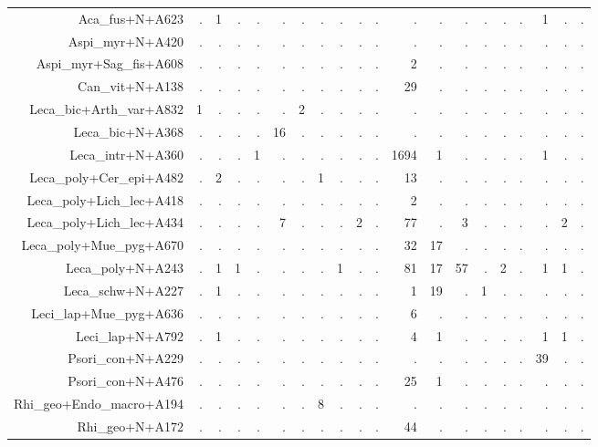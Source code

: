 \documentclass[a4paper, 11]{article}\usepackage[]{graphicx}\usepackage[]{color}
\begin{document}
\begin{table}
\begin{tabular}{rrrrrrrrrrrrrrrrrrrr}
  \hline
Aca\_fus+N+A623 & . & 1 & . & . & . & . & . & . & . & . & . & . & . & . & . & . & 1 & . & . \\ 
  Aspi\_myr+N+A420 & . & . & . & . & . & . & . & . & . & . & . & . & . & . & . & . & . & . & . \\ 
  Aspi\_myr+Sag\_fis+A608 & . & . & . & . & . & . & . & . & . & . & 2 & . & . & . & . & . & . & . & . \\ 
  Can\_vit+N+A138 & . & . & . & . & . & . & . & . & . & . & 29 & . & . & . & . & . & . & . & . \\ 
  Leca\_bic+Arth\_var+A832 & 1 & . & . & . & . & 2 & . & . & . & . & . & . & . & . & . & . & . & . & . \\ 
  Leca\_bic+N+A368 & . & . & . & . & 16 & . & . & . & . & . & . & . & . & . & . & . & . & . & . \\ 
  Leca\_intr+N+A360 & . & . & . & 1 & . & . & . & . & . & . & 1694 & 1 & . & . & . & . & 1 & . & . \\ 
  Leca\_poly+Cer\_epi+A482 & . & 2 & . & . & . & . & 1 & . & . & . & 13 & . & . & . & . & . & . & . & . \\ 
  Leca\_poly+Lich\_lec+A418 & . & . & . & . & . & . & . & . & . & . & 2 & . & . & . & . & . & . & . & . \\ 
  Leca\_poly+Lich\_lec+A434 & . & . & . & . & 7 & . & . & . & 2 & . & 77 & . & 3 & . & . & . & . & 2 & . \\ 
  Leca\_poly+Mue\_pyg+A670 & . & . & . & . & . & . & . & . & . & . & 32 & 17 & . & . & . & . & . & . & . \\ 
  Leca\_poly+N+A243 & . & 1 & 1 & . & . & . & . & 1 & . & . & 81 & 17 & 57 & . & 2 & . & 1 & 1 & . \\ 
  Leca\_schw+N+A227 & . & 1 & . & . & . & . & . & . & . & . & 1 & 19 & . & 1 & . & . & . & . & . \\ 
  Leci\_lap+Mue\_pyg+A636 & . & . & . & . & . & . & . & . & . & . & 6 & . & . & . & . & . & . & . & . \\ 
  Leci\_lap+N+A792 & . & 1 & . & . & . & . & . & . & . & . & 4 & 1 & . & . & . & . & 1 & 1 & . \\ 
  Psori\_con+N+A229 & . & . & . & . & . & . & . & . & . & . & . & . & . & . & . & . & 39 & . & . \\ 
  Psori\_con+N+A476 & . & . & . & . & . & . & . & . & . & . & 25 & 1 & . & . & . & . & . & . & . \\ 
  Rhi\_geo+Endo\_macro+A194 & . & . & . & . & . & . & 8 & . & . & . & . & . & . & . & . & . & . & . & . \\ 
  Rhi\_geo+N+A172 & . & . & . & . & . & . & . & . & . & . & 44 & . & . & . & . & . & . & . & . \\ 

\end{tabular}
\end{table}
\end{document}
